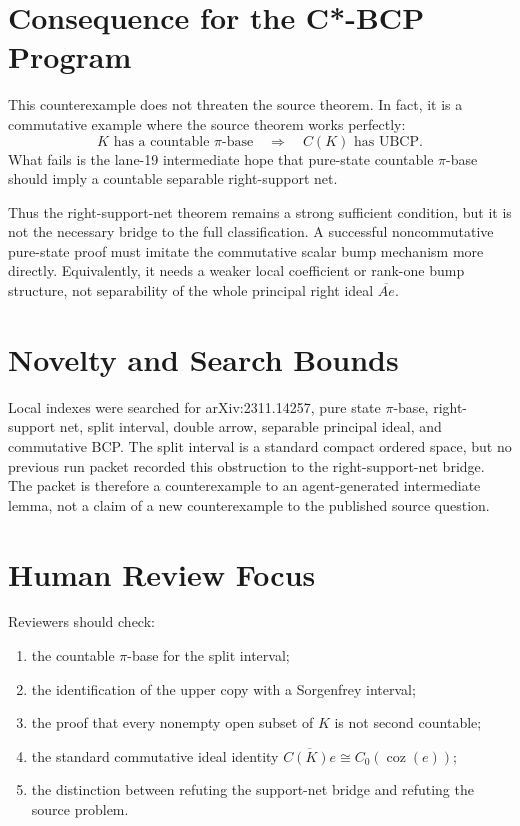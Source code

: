 \documentclass[11pt]{article}
\newcommand{\coz}{\operatorname{coz}}
\newcommand{\cl}{\overline}
\begin{document}
\section*{Consequence for the C*-BCP Program}

This counterexample does not threaten the source theorem.  In fact, it is a
commutative example where the source theorem works perfectly:
\[
        K\text{ has a countable }\pi\text{-base}
        \quad\Longrightarrow\quad
        C(K)\text{ has UBCP}.
\]
What fails is the lane-19 intermediate hope that pure-state countable
\(\pi\)-base should imply a countable separable right-support net.

Thus the right-support-net theorem remains a strong sufficient condition, but
it is not the necessary bridge to the full classification.  A successful
noncommutative pure-state proof must imitate the commutative scalar bump
mechanism more directly.  Equivalently, it needs a weaker local coefficient
or rank-one bump structure, not separability of the whole principal right
ideal \(\cl{Ae}\).

\section*{Novelty and Search Bounds}

Local indexes were searched for arXiv:2311.14257, pure state \(\pi\)-base,
right-support net, split interval, double arrow, separable principal ideal,
and commutative BCP.  The split interval is a standard compact ordered space,
but no previous run packet recorded this obstruction to the right-support-net
bridge.  The packet is therefore a counterexample to an agent-generated
intermediate lemma, not a claim of a new counterexample to the published
source question.

\section*{Human Review Focus}

Reviewers should check:
\begin{enumerate}
    \item the countable \(\pi\)-base for the split interval;
    \item the identification of the upper copy with a Sorgenfrey interval;
    \item the proof that every nonempty open subset of \(K\) is not second
          countable;
    \item the standard commutative ideal identity
          \(\cl{C(K)e}\cong C_0(\coz(e))\);
    \item the distinction between refuting the support-net bridge and
          refuting the source problem.
\end{enumerate}
\end{document}
